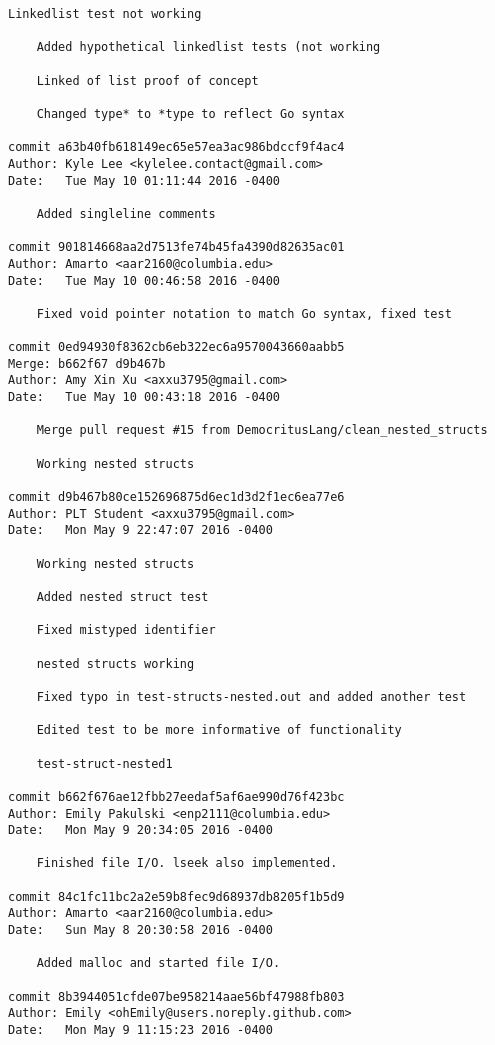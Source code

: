 \begin{lstlisting}[backgroundcolor=\color{white}]
    Linkedlist test not working
    
    Added hypothetical linkedlist tests (not working
    
    Linked of list proof of concept
    
    Changed type* to *type to reflect Go syntax

commit a63b40fb618149ec65e57ea3ac986bdccf9f4ac4
Author: Kyle Lee <kylelee.contact@gmail.com>
Date:   Tue May 10 01:11:44 2016 -0400

    Added singleline comments

commit 901814668aa2d7513fe74b45fa4390d82635ac01
Author: Amarto <aar2160@columbia.edu>
Date:   Tue May 10 00:46:58 2016 -0400

    Fixed void pointer notation to match Go syntax, fixed test

commit 0ed94930f8362cb6eb322ec6a9570043660aabb5
Merge: b662f67 d9b467b
Author: Amy Xin Xu <axxu3795@gmail.com>
Date:   Tue May 10 00:43:18 2016 -0400

    Merge pull request #15 from DemocritusLang/clean_nested_structs
    
    Working nested structs

commit d9b467b80ce152696875d6ec1d3d2f1ec6ea77e6
Author: PLT Student <axxu3795@gmail.com>
Date:   Mon May 9 22:47:07 2016 -0400

    Working nested structs
    
    Added nested struct test
    
    Fixed mistyped identifier
    
    nested structs working
    
    Fixed typo in test-structs-nested.out and added another test
    
    Edited test to be more informative of functionality
    
    test-struct-nested1

commit b662f676ae12fbb27eedaf5af6ae990d76f423bc
Author: Emily Pakulski <enp2111@columbia.edu>
Date:   Mon May 9 20:34:05 2016 -0400

    Finished file I/O. lseek also implemented.

commit 84c1fc11bc2a2e59b8fec9d68937db8205f1b5d9
Author: Amarto <aar2160@columbia.edu>
Date:   Sun May 8 20:30:58 2016 -0400

    Added malloc and started file I/O.

commit 8b3944051cfde07be958214aae56bf47988fb803
Author: Emily <ohEmily@users.noreply.github.com>
Date:   Mon May 9 11:15:23 2016 -0400


\end{lstlisting}
